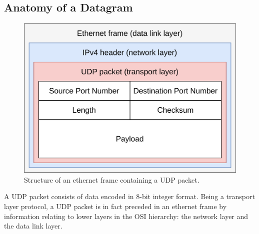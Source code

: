 \subsection{Anatomy of a Datagram}\label{subsec:anatomy-of-a-datagram}

\begin{figure}[h]
    \centering
    \includegraphics[width=.5\textwidth]{figures/udp}
    \caption{Structure of an ethernet frame containing a UDP packet.}
    \label{fig:udp-frame}
\end{figure}

A UDP packet consists of data encoded in 8-bit integer format.
Being a transport layer protocol, a UDP packet is in fact preceded in an
ethernet frame by information relating to lower layers in the OSI hierarchy: the
network layer and the data link layer.
